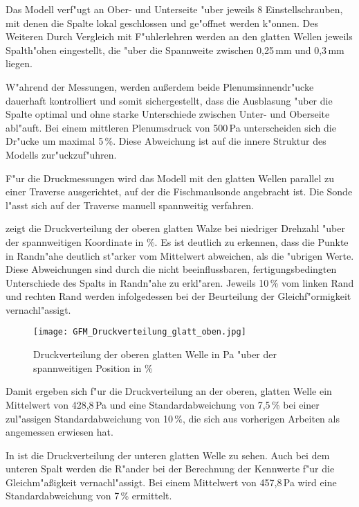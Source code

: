 Das Modell verf"ugt an Ober- und Unterseite "uber jeweils 8 Einstellschrauben, mit denen die Spalte lokal geschlossen und ge"offnet werden k"onnen. Des Weiteren 
Durch Vergleich mit F"uhlerlehren werden an den glatten Wellen jeweils Spalth"ohen eingestellt, die "uber die Spannweite zwischen 0,25\,mm und 0,3\,mm liegen.

W"ahrend der Messungen, werden au\ss{}erdem beide Plenumsinnendr"ucke dauerhaft kontrolliert und somit sichergestellt, dass die Ausblasung "uber die Spalte optimal und ohne starke Unterschiede zwischen Unter- und Oberseite abl"auft.
Bei einem mittleren Plenumsdruck von 500\,Pa unterscheiden sich die Dr"ucke um maximal 5\,\%. Diese Abweichung ist auf die innere Struktur des Modells zur"uckzuf"uhren.

F"ur die Druckmessungen wird das Modell mit den glatten Wellen parallel zu einer Traverse ausgerichtet, auf der die Fischmaulsonde angebracht ist. Die Sonde l"asst sich auf der Traverse manuell spannweitig verfahren. 

 zeigt die Druckverteilung der oberen glatten Walze bei niedriger Drehzahl "uber der spannweitigen Koordinate in \%. Es ist deutlich zu erkennen, dass die Punkte in Randn"ahe deutlich st"arker vom Mittelwert abweichen, als die "ubrigen Werte. Diese Abweichungen sind durch die nicht beeinflussbaren, fertigungsbedingten Unterschiede des Spalts in Randn"ahe zu erkl"aren.
Jeweils 10\,\% vom linken Rand und rechten Rand werden infolgedessen bei der Beurteilung der Gleichf"ormigkeit vernachl"assigt.

\begin{figure}[h]
	\centering
	\texttt{[image: GFM\_Druckverteilung\_glatt\_oben.jpg]}
	\caption{Druckverteilung der oberen glatten Welle in Pa "uber der spannweitigen Position in \%}
	\label{fig:Druckverteilung_glatt_oben}
\end{figure}

Damit ergeben sich f"ur die Druckverteilung an der oberen, glatten Welle ein Mittelwert von 428,8\,Pa und eine Standardabweichung von 7,5\,\% bei einer zul"assigen Standardabweichung von 10\,\%, die sich aus vorherigen Arbeiten als angemessen erwiesen hat.

In  ist die Druckverteilung der unteren glatten Welle zu sehen.
Auch bei dem unteren Spalt werden die R"ander bei der Berechnung der Kennwerte f"ur die Gleichm"a\ss{}igkeit vernachl"assigt.
Bei einem Mittelwert von 457,8\,Pa wird eine Standardabweichung von 7\,\% ermittelt.

